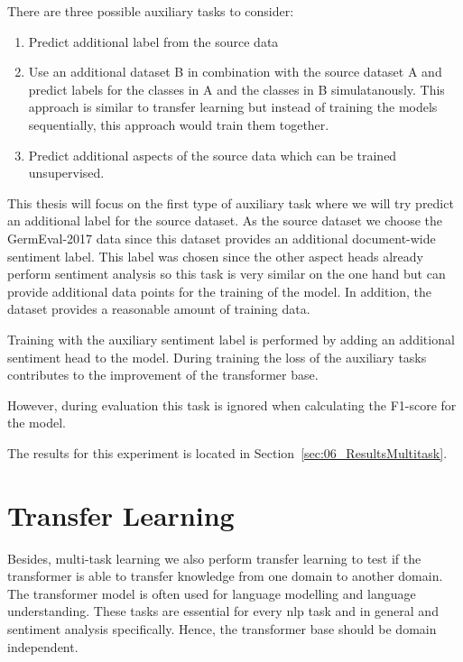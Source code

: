 There are three possible auxiliary tasks to consider:


\begin{enumerate}
	\item Predict additional label from the source data
	\item Use an additional dataset B in combination with the source dataset A and predict labels for the classes in A and the classes in B simulatanously. This approach is similar to transfer learning but instead of training the models sequentially, this approach would train them together.
	\item Predict additional aspects of the source data which can be trained unsupervised.
\end{enumerate}

This thesis will focus on the first type of auxiliary task where we will try predict an additional label for the source dataset. As the source dataset we choose the GermEval-2017 data since this dataset provides an additional document-wide sentiment label. This label was chosen since the other aspect heads already perform sentiment analysis so this task is very similar on the one hand but can provide additional data points for the training of the model. In addition, the dataset provides a reasonable amount of training data.

Training with the auxiliary sentiment label is performed by adding an additional sentiment head to the model. During training the loss of the auxiliary tasks contributes to the improvement of the transformer base.

However, during evaluation this task is ignored when calculating the F1-score for the model.
\medskip

The results for this experiment is located in Section~\ref{sec:06_ResultsMultitask}.



\section{Transfer Learning}
\label{sec:04_transferLearning}

Besides, multi-task learning we also perform transfer learning to test if the transformer is able to transfer knowledge from one domain to another domain. The transformer model is often used for language modelling and language understanding. These tasks are essential for every \gls{nlp} task and in general and sentiment analysis specifically. Hence, the transformer base should be domain independent. 
\medskip

